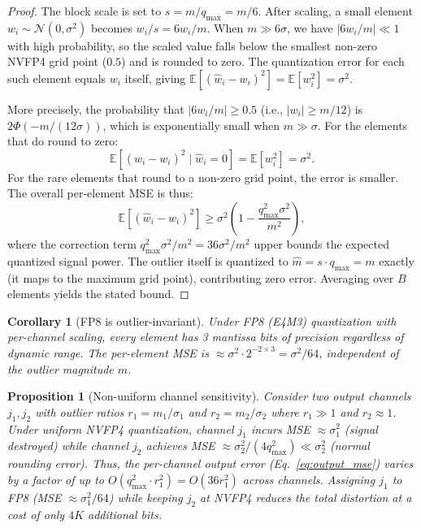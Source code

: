 \documentclass{article}
\newtheorem{proposition}{Proposition}
\newtheorem{corollary}{Corollary}
\begin{document}
\begin{proof}
The block scale is set to $s = m / q_\text{max} = m/6$.
After scaling, a small element $w_i \sim \mathcal{N}(0, \sigma^2)$ becomes $w_i / s = 6w_i / m$.
When $m \gg 6\sigma$, we have $|6w_i / m| \ll 1$ with high probability, so the scaled value falls below the smallest non-zero NVFP4 grid point ($0.5$) and is rounded to zero.
The quantization error for each such element equals $w_i$ itself, giving $\mathbb{E}[(\hat{w}_i - w_i)^2] = \mathbb{E}[w_i^2] = \sigma^2$.

More precisely, the probability that $|6w_i/m| \geq 0.5$ (i.e., $|w_i| \geq m/12$) is $2\Phi(-m/(12\sigma))$, which is exponentially small when $m \gg \sigma$.
For the elements that do round to zero:
\begin{equation}
\mathbb{E}[(\hat{w}_i - w_i)^2 \mid \hat{w}_i = 0] = \mathbb{E}[w_i^2] = \sigma^2.
\end{equation}
For the rare elements that round to a non-zero grid point, the error is smaller.
The overall per-element MSE is thus:
\begin{equation}
\mathbb{E}[(\hat{w}_i - w_i)^2] \geq \sigma^2\!\left(1 - \frac{q_\text{max}^2 \sigma^2}{m^2}\right),
\end{equation}
where the correction term $q_\text{max}^2\sigma^2/m^2 = 36\sigma^2/m^2$ upper bounds the expected quantized signal power.
The outlier itself is quantized to $\hat{m} = s \cdot q_\text{max} = m$ exactly (it maps to the maximum grid point), contributing zero error.
Averaging over $B$ elements yields the stated bound.
\end{proof}

\begin{corollary}[FP8 is outlier-invariant]
\label{cor:fp8}
Under FP8 (E4M3) quantization with per-channel scaling, every element has 3 mantissa bits of precision regardless of dynamic range.
The per-element MSE is $\approx \sigma^2 \cdot 2^{-2 \times 3} = \sigma^2/64$, independent of the outlier magnitude $m$.
\end{corollary}

\begin{proposition}[Non-uniform channel sensitivity]
\label{prop:nonuniform}
Consider two output channels $j_1, j_2$ with outlier ratios $r_1 = m_1/\sigma_1$ and $r_2 = m_2/\sigma_2$ where $r_1 \gg 1$ and $r_2 \approx 1$.
Under uniform NVFP4 quantization, channel $j_1$ incurs MSE $\approx \sigma_1^2$ (signal destroyed) while channel $j_2$ achieves MSE $\approx \sigma_2^2/(4q_\text{max}^2) \ll \sigma_2^2$ (normal rounding error).
Thus, the per-channel output error (Eq.~\ref{eq:output_mse}) varies by a factor of up to $O(q_\text{max}^2 \cdot r_1^2) = O(36 r_1^2)$ across channels.
Assigning $j_1$ to FP8 (MSE $\approx \sigma_1^2/64$) while keeping $j_2$ at NVFP4 reduces the total distortion at a cost of only $4K$ additional bits.
\end{proposition}
\end{document}
